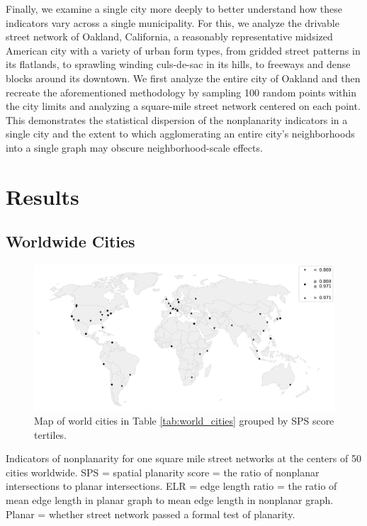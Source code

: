 \documentclass[Afour,sageh,times]{sagej}
\begin{document}
Finally, we examine a single city more deeply to better understand how these indicators vary across a single municipality. For this, we analyze the drivable street network of Oakland, California, a reasonably representative midsized American city with a variety of urban form types, from gridded street patterns in its flatlands, to sprawling winding culs-de-sac in its hills, to freeways and dense blocks around its downtown. We first analyze the entire city of Oakland and then recreate the aforementioned methodology by sampling 100 random points within the city limits and analyzing a square-mile street network centered on each point. This demonstrates the statistical dispersion of the nonplanarity indicators in a single city and the extent to which agglomerating an entire city's neighborhoods into a single graph may obscure neighborhood-scale effects.





\section{Results}

\subsection{Worldwide Cities}

\begin{figure}[htbp]
    \center
    \includegraphics[width=\textwidth]{world_map_phi_bw.png}
    \caption{Map of world cities in Table \ref{tab:world_cities} grouped by SPS score tertiles.}
    \label{fig:world_map_bw}
\end{figure}


\begin{table}[htbp]
\centering
\caption{Indicators of nonplanarity for one square mile street networks at the centers of 50 cities worldwide. SPS = spatial planarity score = the ratio of nonplanar intersections to planar intersections. ELR = edge length ratio = the ratio of mean edge length in planar graph to mean edge length in nonplanar graph. Planar = whether street network passed a formal test of planarity.}
\label{tab:world_cities}

\end{table}
\end{document}
